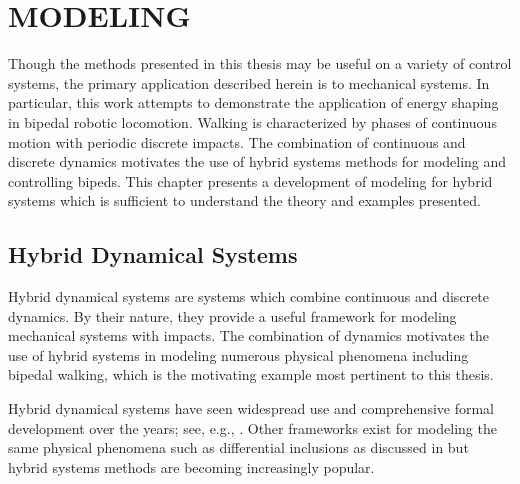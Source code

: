 \chapter{\uppercase{Modeling}} \label{ch:modeling}

Though the methods presented in this thesis may be useful on a variety of
control systems, the primary application described herein is to mechanical
systems.
%
In particular, this work attempts to demonstrate the application of energy
shaping in bipedal robotic locomotion.
%
Walking is characterized by phases of continuous motion with periodic discrete
impacts.
%
The combination of continuous and discrete dynamics motivates the use of hybrid
systems methods for modeling and controlling bipeds.
%
This chapter presents a development of modeling for hybrid systems which is
sufficient to understand the theory and examples presented.
%

\section{Hybrid Dynamical Systems}

Hybrid dynamical systems are systems which combine continuous and discrete
dynamics.
%
By their nature, they provide a useful framework for modeling mechanical systems
with impacts.
%
The combination of dynamics motivates the use of hybrid systems in modeling
numerous physical phenomena including bipedal walking, which is the motivating
example most pertinent to this thesis.
%

Hybrid dynamical systems have seen widespread use and comprehensive formal
development over the years;
%
see, e.g., \cite{Branicky1998, Goebel2009, Grizzle2014, Schaft2000,
  Westervelt2007}.
%
Other frameworks exist for modeling the same physical phenomena such as
differential inclusions as discussed in \cite{Filippov1988} but hybrid systems
methods are becoming increasingly popular.

